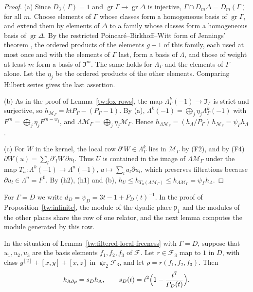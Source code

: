 \begin{proof}
(a) Since $D_3(\Gamma)=1$ and $\operatorname{gr}\Gamma\to\operatorname{gr}\Delta$
is injective, $\Gamma\cap D_m\Delta=D_m(\Gamma)$ for all $m$. Choose elements
of $\Gamma$ whose classes form a homogeneous basis of $\operatorname{gr}\Gamma$,
and extend them by elements of $\Delta$ to a family whose classes form a
homogeneous basis of $\operatorname{gr}\Delta$. By the restricted
Poincar\'e--Birkhoff--Witt form of Jennings' theorem \cite{Jennings,Quillen},
the ordered products of the elements $g-1$ of this family, each used at most
once and with the elements of $\Gamma$ last, form a basis of $\Lambda$, and
those of weight at least $m$ form a basis of $\mathfrak I^m$. The same holds
for $\Lambda_\Gamma$ and the elements of $\Gamma$ alone. Let the $\eta_j$ be
the ordered products of the other elements. Comparing Hilbert series gives
the last assertion.

(b) As in the proof of Lemma~\ref{tw:fox-rows}, the map
$\Lambda_\Gamma^k(-1)\to\mathfrak I_\Gamma$ is strict and surjective, so
$h_{\mathcal M_\Gamma}=ktP_\Gamma-(P_\Gamma-1)$. By (a),
$\Lambda^k(-1)=\bigoplus_j\eta_j\Lambda_\Gamma^k(-1)$ with
$F^m=\bigoplus_j\eta_jF^{m-w_j}$, and
$\Lambda\mathcal M_\Gamma=\bigoplus_j\eta_j\mathcal M_\Gamma$. Hence
$h_{\Lambda\mathcal M_\Gamma}=(h_\Lambda/P_\Gamma)\,h_{\mathcal M_\Gamma}=\psi_\Gamma h_\Lambda$.

(c) For $W$ in the kernel, the local row $\partial'W\in\Lambda_\Gamma^k$ lies in
$\mathcal M_\Gamma$ by (F2), and by (F4)
$\partial W(u)=\sum_l\partial'_lW\,\partial u_l$. Thus $U$ is contained in the
image of $\Lambda\mathcal M_\Gamma$ under the map
$T_u\colon\Lambda^k(-1)\to\Lambda^n(-1)$, $a\mapsto\sum_la_l\partial u_l$,
which preserves filtrations because $\partial u_l\in\Lambda^n=F^0$. By (h2),
(h1) and (b),
$h_U\le h_{T_u(\Lambda\mathcal M_\Gamma)}\le h_{\Lambda\mathcal M_\Gamma}=\psi_\Gamma h_\Lambda$.
\end{proof}

For $\Gamma=D$ we write $d_D=\psi_D=3t-1+P_D(t)^{-1}$. In the proof of
Proposition~\ref{tw:infinite}, the module of the dyadic place $\mathfrak p_1$
and the modules of the other places share the row of one relator, and the
next lemma computes the module generated by this row.

\begin{lemma}\label{tw:local-fox}
In the situation of Lemma~\ref{tw:filtered-local-freeness} with $\Gamma=D$,
suppose that $u_1,u_2,u_3$ are the basis elements $f_1,f_2,f_3$ of
$\mathcal F$. Let $r\in\mathcal F_3$ map to $1$ in $D$, with class
$y^{[2]}+[x,y]+[x,z]$ in $\operatorname{gr}_2\mathcal F_3$, and let
$\rho=r(f_1,f_2,f_3)$. Then
\[
 h_{\Lambda\partial\rho}=s_Dh_\Lambda,\qquad
 s_D(t)=t^2\Bigl(1-\frac{t^7}{P_D(t)}\Bigr).
\]
\end{lemma}

